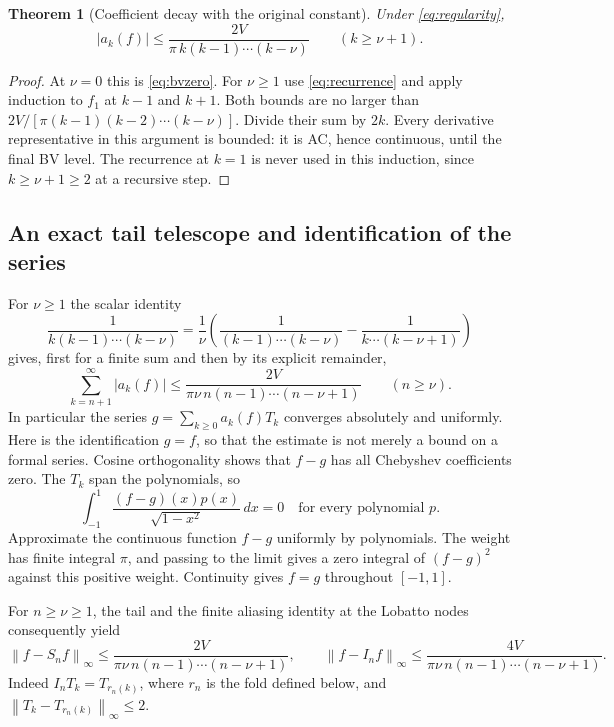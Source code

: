 \documentclass[11pt]{article}
\newcommand{\norm}[1]{\left\lVert#1\right\rVert}
\newtheorem{theorem}{Theorem}[section]
\theoremstyle{remark}\newtheorem{remark}[theorem]{Remark}
\begin{document}
\begin{theorem}[Coefficient decay with the original constant]\label{thm:bv}
Under \eqref{eq:regularity},
\begin{equation}\label{eq:bvdecay}
 |a_k(f)|\le\frac{2V}{\pi\,k(k-1)\cdots(k-\nu)}\qquad(k\ge\nu+1).
\end{equation}
\end{theorem}
\begin{proof}
At $\nu=0$ this is \eqref{eq:bvzero}. For $\nu\ge1$ use
\eqref{eq:recurrence} and apply induction to $f_1$ at $k-1$ and $k+1$.
Both bounds are no larger than
$2V/[\pi(k-1)(k-2)\cdots(k-\nu)]$. Divide their sum by $2k$.
Every derivative representative in this argument is bounded: it is AC,
hence continuous, until the final BV level. The recurrence at $k=1$ is
never used in this induction, since $k\ge\nu+1\ge2$ at a recursive step.
\end{proof}

\subsection{An exact tail telescope and identification of the series}
For $\nu\ge1$ the scalar identity
\[
 \frac1{k(k-1)\cdots(k-\nu)}
 =\frac1\nu\left(\frac1{(k-1)\cdots(k-\nu)}
                 -\frac1{k\cdots(k-\nu+1)}\right)
\]
gives, first for a finite sum and then by its explicit remainder,
\begin{equation}\label{eq:tail}
 \sum_{k=n+1}^\infty |a_k(f)|
 \le\frac{2V}{\pi\nu\,n(n-1)\cdots(n-\nu+1)}\qquad(n\ge\nu).
\end{equation}
In particular the series $g=\sum_{k\ge0}a_k(f)T_k$ converges absolutely
and uniformly. Here is the identification $g=f$, so that the estimate is
not merely a bound on a formal series. Cosine orthogonality shows that
$f-g$ has all Chebyshev coefficients zero. The $T_k$ span the polynomials,
so
\[
 \int_{-1}^1\frac{(f-g)(x)p(x)}{\sqrt{1-x^2}}\,dx=0
 \quad\text{for every polynomial }p.
\]
Approximate the continuous function $f-g$ uniformly by polynomials.
The weight has finite integral $\pi$, and passing to the limit gives a
zero integral of $(f-g)^2$ against this positive weight. Continuity gives
$f=g$ throughout $[-1,1]$.

For $n\ge\nu\ge1$, the tail and the finite aliasing identity at the
Lobatto nodes consequently yield
\[
 \norm{f-S_nf}_\infty\le\frac{2V}{\pi\nu\,n(n-1)\cdots(n-\nu+1)},
 \qquad
 \norm{f-I_nf}_\infty\le\frac{4V}{\pi\nu\,n(n-1)\cdots(n-\nu+1)}.
\]
Indeed $I_nT_k=T_{r_n(k)}$, where $r_n$ is the fold defined below,
and $\norm{T_k-T_{r_n(k)}}_\infty\le2$.
\end{document}
